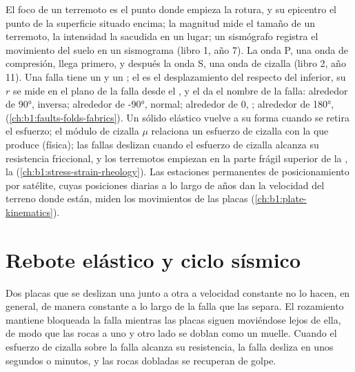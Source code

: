 \begin{recall}
El foco de un terremoto es el punto donde empieza la rotura, y su epicentro el punto de la superficie situado encima; la magnitud
mide el tamaño de un terremoto, la intensidad la sacudida en un lugar; un sismógrafo registra el movimiento del suelo en un
sismograma (libro 1, año 7). La onda P, una onda de compresión, llega primero, y después la onda S, una onda de cizalla (libro 2,
año 11). Una falla tiene un  y un ; el  es el desplazamiento del  respecto del inferior, su  $r$ se mide en el plano de la falla desde el , y el  da el nombre de la
falla: alrededor de \ang{90}, inversa; alrededor de \ang{-90}, normal; alrededor de 0, ; alrededor de \ang{180}, 
(\cref{ch:b1:faults-folds-fabrics}). Un sólido elástico vuelve a su forma cuando se retira el esfuerzo; el módulo de cizalla $\mu$
relaciona un esfuerzo de cizalla con la  que produce (física); las fallas deslizan cuando el esfuerzo de
cizalla alcanza su resistencia friccional, y los terremotos empiezan en la parte frágil superior de la , la  (\cref{ch:b1:stress-strain-rheology}). Las estaciones permanentes de posicionamiento por satélite, cuyas posiciones
diarias a lo largo de años dan la velocidad del terreno donde están, miden los movimientos de las placas
(\cref{ch:b1:plate-kinematics}).
\end{recall}

\section{Rebote elástico y ciclo sísmico}\label{sec:b1:earthquake-source:cycle}

Dos placas que se deslizan una junto a otra a velocidad constante no lo hacen, en general, de manera constante a lo largo de la falla
que las separa. El rozamiento mantiene bloqueada la falla mientras las placas siguen moviéndose lejos de ella, de modo que las
rocas a uno y otro lado se doblan como un muelle. Cuando el esfuerzo de cizalla sobre la falla alcanza su resistencia, la falla desliza
en unos segundos o minutos, y las rocas dobladas se recuperan de golpe.

